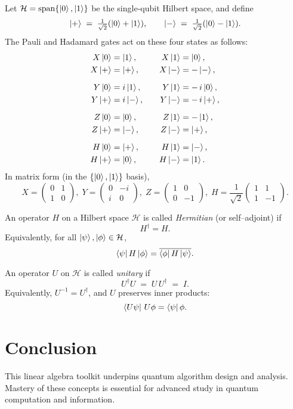 \begin{definition}
	Let $\mathcal H=\operatorname*{span}\{\ket0,\ket1\}$ be the single‐qubit Hilbert space, and define
	\[
	\ket+\;=\;\tfrac1{\sqrt2}(\ket0+\ket1),
	\qquad
	\ket-\;=\;\tfrac1{\sqrt2}(\ket0-\ket1).
	\]
	The Pauli and Hadamard gates act on these four states as follows:
	\[
	\begin{aligned}
		X\ket0&=\ket1,&\quad X\ket1&=\ket0,\\
		X\ket+&=\ket+,&\quad X\ket-&=-\ket-,\\[6pt]
		Y\ket0&=i\ket1,&\quad Y\ket1&=-\,i\ket0,\\
		Y\ket+&=i\ket-,&\quad Y\ket-&=-\,i\ket+,\\[6pt]
		Z\ket0&=\ket0,&\quad Z\ket1&=-\ket1,\\
		Z\ket+&=\ket-,&\quad Z\ket-&=\ket+,\\[6pt]
		H\ket0&=\ket+,&\quad H\ket1&=\ket-,\\
		H\ket+&=\ket0,&\quad H\ket-&=\ket1.
	\end{aligned}
	\]
	In matrix form (in the $\{\ket0,\ket1\}$ basis),
	\[
	X=\begin{pmatrix}0&1\\1&0\end{pmatrix},\;
	Y=\begin{pmatrix}0&-i\\i&0\end{pmatrix},\;
	Z=\begin{pmatrix}1&0\\0&-1\end{pmatrix},\;
	H=\frac1{\sqrt2}\begin{pmatrix}1&1\\1&-1\end{pmatrix}.
	\]
\end{definition}

\begin{definition}
	An operator \(H\) on a Hilbert space \(\mathcal H\) is called \emph{Hermitian} (or self–adjoint) if
	\[
	H^\dagger = H.
	\]
	Equivalently, for all \(\ket{\psi},\ket{\phi}\in\mathcal H\),
	\[
	\bra{\psi}H\ket{\phi}
	= \overline{\bra{\phi}H\ket{\psi}}.
	\]
\end{definition}

\begin{definition}
	An operator \(U\) on \(\mathcal H\) is called \emph{unitary} if
	\[
	U^\dagger U \;=\; U\,U^\dagger \;=\; I.
	\]
	Equivalently, \(U^{-1}=U^\dagger\), and \(U\) preserves inner products:
	\[
	\bra{U\psi}\,U\phi = \bra{\psi}\phi.
	\]
\end{definition}


\section{Conclusion}
This linear algebra toolkit underpins quantum algorithm design and analysis. Mastery of these concepts is essential for advanced study in quantum computation and information.


